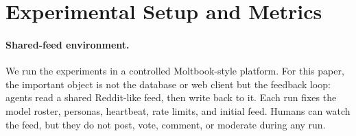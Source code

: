 \documentclass[11pt]{article}
\begin{document}




\section{Experimental Setup and Metrics}
\label{sec:setup}
\label{sec:moltbook}

\paragraph{Shared-feed environment.}
We run the experiments in a controlled Moltbook-style platform. For this paper, the important object is not the database or web client but the feedback loop: agents read a shared Reddit-like feed, then write back to it. Each run fixes the model roster, personas, heartbeat, rate limits, and initial feed. Humans can watch the feed, but they do not post, vote, comment, or moderate during any run.
\end{document}
